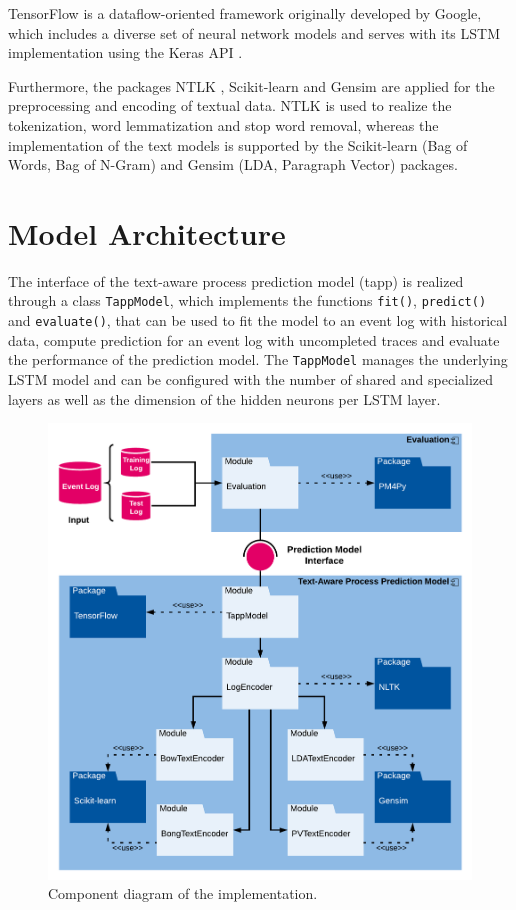 TensorFlow \cite{DBLP:journals/corr/AbadiABBCCCDDDG16} is a dataflow-oriented framework originally developed by Google, which includes a diverse set of neural network models and serves with its LSTM implementation using the Keras API \cite{chollet2015keras}.

Furthermore, the packages NTLK \cite{DBLP:books/daglib/0022921}, Scikit-learn \cite{DBLP:journals/jmlr/PedregosaVGMTGBPWDVPCBPD11} and Gensim \cite{rehurek_lrec} are applied for the preprocessing and encoding of textual data.
NTLK is used to realize the tokenization, word lemmatization and stop word removal, whereas the implementation of the text models is supported by the Scikit-learn (Bag of Words, Bag of N-Gram) and Gensim (LDA, Paragraph Vector) packages.


\section{Model Architecture}\label{sec:model-implementation}

The interface of the text-aware process prediction model (tapp) is realized through a class \texttt{TappModel}, which implements the functions \texttt{fit()},  \texttt{predict()} and  \texttt{evaluate()}, that can be used to fit the model to an event log with historical data, compute prediction for an event log with uncompleted traces and evaluate the performance of the prediction model.
The \texttt{TappModel} manages the underlying LSTM model and can be configured with the number of shared and specialized layers as well as the dimension of the hidden neurons per LSTM layer.

\begin{figure}[htbp!]
	\centering
	\includegraphics[width=\textwidth]{figures/implementation}
	\caption[Component diagram of the implementation]{Component diagram of the implementation.}
	\label{fig:/implementation}
\end{figure}

